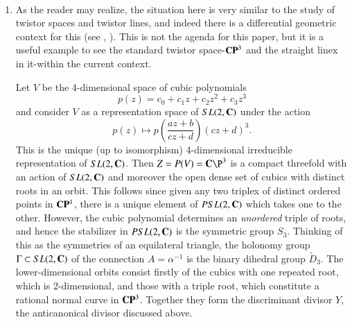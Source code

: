 \begin{example*}
~

\begin{enumerate}[]
\item As the reader may realize, the situation here is very similar to the study of twistor spaces and twistor lines, and indeed there is a differential geometric context for this (see \cite{art7-key6}, \cite{art7-key7}). This is not the agenda for this paper, but it is a useful example to see the standard twistor space-$\mathbf{C}\mathbf{P}^{3}$ and the straight linex in it-within the current context.

Let $V$ be the 4-dimensional space of cubic polynomials
$$
p(z)=c_{0} + c_{1}z +c_{2}z^{2} + c_{3}z^{3}
$$
and consider $V$ as a representation space of $SL(2, \mathbf{C})$ under the action
$$
p(z)\mapsto p \left( \dfrac{az + b}{cz + d}\right)(cz + d)^{3}.
$$
This is the unique (up to isomorphism) 4-dimensional irreducible representation of $SL(2, \mathbf{C})$. Then $Z= P(V) = \bC\P^{3}$ is a compact threefold with an action of $SL(2, \mathbf{C})$ and moreover the open dense set of cubics with distinct roots in an orbit. This follows since given any two triplex of distinct ordered points in $\mathbf{C}\mathbf{P}^{1}$, there is a unique element of $PSL(2, \mathbf{C})$ which takes one to the other. However, the cubic polynomial determines an \textit{unordered} triple of roots, and hence the stabilizer in $PSL(2, \mathbf{C})$ is the symmetric group $S_{3}$. Thinking of this as the symmetries of an equilateral triangle, the holonomy group $\Gamma \subset SL(2, \mathbf{C})$ of the connection $A= \alpha^{-1}$ is the binary dihedral group $\tilde{D}_{3}$. The lower-dimensional orbits consist firstly of the cubics with one repeated root, which is
2-dimensional, and those with a triple root, which constitute a rational normal curve in $\mathbf{C}\mathbf{P}^{3}$. Together they form the discriminant divisor $Y$, the anticanonical divisor discussed above.


\end{enumerate}
\end{example*}
